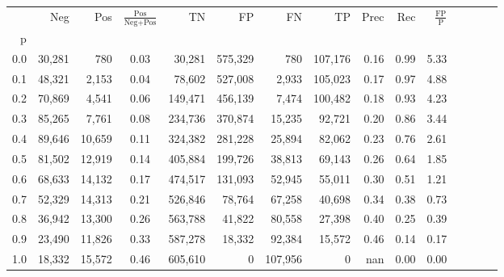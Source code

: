 \begin{tabular}{rrrcrrrrrrrrrrr}
\toprule
{} &     Neg &     Pos & $\frac{\text{Pos}}{\text{Neg}+\text{Pos}}$ &       TN &       FP &       FN &       TP &  Prec &   Rec & $\frac{\text{FP}}{\text{P}}$ \\
p   &         &         &                                            &          &          &          &          &       &       &                              \\
\midrule
0.0 &  30,281 &     780 &                                       0.03 &   30,281 &  575,329 &      780 &  107,176 &  0.16 &  0.99 &                         5.33 \\
0.1 &  48,321 &   2,153 &                                       0.04 &   78,602 &  527,008 &    2,933 &  105,023 &  0.17 &  0.97 &                         4.88 \\
0.2 &  70,869 &   4,541 &                                       0.06 &  149,471 &  456,139 &    7,474 &  100,482 &  0.18 &  0.93 &                         4.23 \\
0.3 &  85,265 &   7,761 &                                       0.08 &  234,736 &  370,874 &   15,235 &   92,721 &  0.20 &  0.86 &                         3.44 \\
0.4 &  89,646 &  10,659 &                                       0.11 &  324,382 &  281,228 &   25,894 &   82,062 &  0.23 &  0.76 &                         2.61 \\
0.5 &  81,502 &  12,919 &                                       0.14 &  405,884 &  199,726 &   38,813 &   69,143 &  0.26 &  0.64 &                         1.85 \\
0.6 &  68,633 &  14,132 &                                       0.17 &  474,517 &  131,093 &   52,945 &   55,011 &  0.30 &  0.51 &                         1.21 \\
0.7 &  52,329 &  14,313 &                                       0.21 &  526,846 &   78,764 &   67,258 &   40,698 &  0.34 &  0.38 &                         0.73 \\
0.8 &  36,942 &  13,300 &                                       0.26 &  563,788 &   41,822 &   80,558 &   27,398 &  0.40 &  0.25 &                         0.39 \\
0.9 &  23,490 &  11,826 &                                       0.33 &  587,278 &   18,332 &   92,384 &   15,572 &  0.46 &  0.14 &                         0.17 \\
1.0 &  18,332 &  15,572 &                                       0.46 &  605,610 &        0 &  107,956 &        0 &   nan &  0.00 &                         0.00 \\
\bottomrule
\end{tabular}
